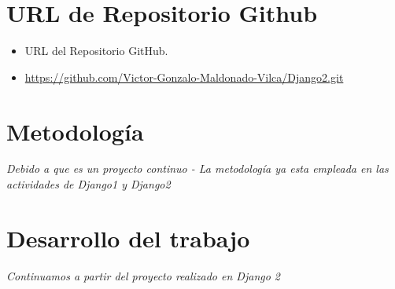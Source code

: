 \documentclass{article}
\begin{document}

  \section{URL de Repositorio Github}
    \begin{itemize}
      \item URL del Repositorio GitHub.
      \item \url{https://github.com/Victor-Gonzalo-Maldonado-Vilca/Django2.git}
    \end{itemize}


  \section{Metodología}
    \textit{Debido a que es un proyecto continuo - La metodología ya esta empleada en las actividades de Django1 y Django2}
    

  \section{Desarrollo del trabajo}
    \textit{Continuamos a partir del proyecto realizado en Django 2}

\end{document}
